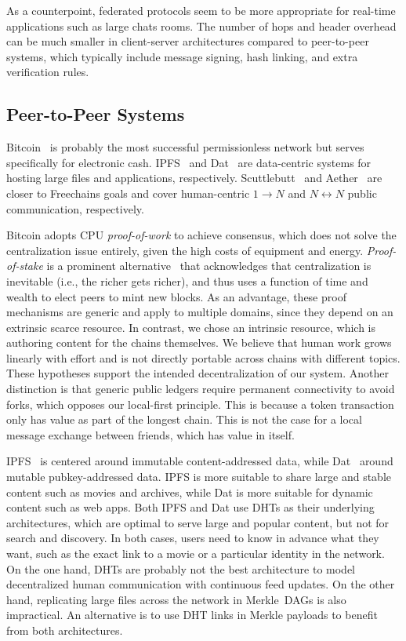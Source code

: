 \documentclass[10pt,journal,compsoc]{IEEEtran}
\newcommand{\FC}       {Freechains\xspace}
\newcommand{\Xon} {$1{\rightarrow}N$\xspace}
\newcommand{\Xnn} {$N{\leftrightarrow}N$\xspace}
\begin{document}
As a counterpoint, federated protocols seem to be more appropriate for
real-time applications such as large chats rooms.
The number of hops and header overhead can be much smaller in client-server
architectures compared to peer-to-peer systems, which typically include message
signing, hash linking, and extra verification rules.

\subsection{Peer-to-Peer Systems}

Bitcoin~\cite{p2p.bitcoin} is probably the most successful permissionless
network but serves specifically for electronic cash.
IPFS~\cite{p2p.ipfs} and Dat~\cite{p2p.dat} are data-centric systems for
hosting large files and applications, respectively.
Scuttlebutt~\cite{p2p.scuttlebutt} and Aether~\cite{p2p.ecosystem} are closer
to \FC goals and cover human-centric \Xon and \Xnn public communication,
respectively.

Bitcoin adopts CPU \emph{proof-of-work} to achieve consensus, which does not
solve the centralization issue entirely, given the high costs of equipment and
energy.
\emph{Proof-of-stake} is a prominent alternative~\cite{p2p.proofs} that
acknowledges that centralization is inevitable (i.e., the richer gets richer),
and thus uses a function of time and wealth to elect peers to mint new blocks.
As an advantage, these proof mechanisms are generic and apply to multiple
domains, since they depend on an extrinsic scarce resource.
%
In contrast, we chose an intrinsic resource, which is authoring content for the
chains themselves.
We believe that human work grows linearly with effort and is not directly
portable across chains with different topics.
These hypotheses support the intended decentralization of our system.
%
Another distinction is that generic public ledgers require permanent
connectivity to avoid forks, which opposes our local-first principle.
This is because a token transaction only has value as part of the longest
chain.
This is not the case for a local message exchange between friends, which has
value in itself.

IPFS~\cite{p2p.ipfs} is centered around immutable content-addressed data, while
Dat~\cite{p2p.dat} around mutable pubkey-addressed data.
IPFS is more suitable to share large and stable content such as movies and
archives, while Dat is more suitable for dynamic content such as web apps.
%
Both IPFS and Dat use DHTs as their underlying architectures, which are optimal
to serve large and popular content, but not for search and discovery.
In both cases, users need to know in advance what they want, such as the exact
link to a movie or a particular identity in the network.
%
On the one hand, DHTs are probably not the best architecture to model
decentralized human communication with continuous feed updates.
On the other hand, replicating large files across the network in Merkle~DAGs is
also impractical.
An alternative is to use DHT links in Merkle payloads to benefit from both
architectures.
\end{document}
